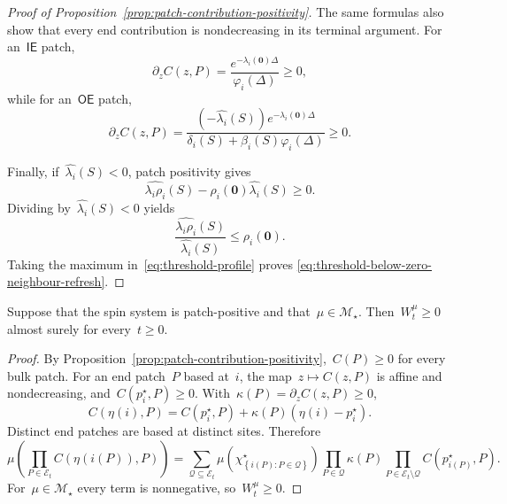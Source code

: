 \documentclass[EJP,preprint,NODS,nobera]{ejpecp}
\newcommand{\bb}[1]{\left(#1\right)}
\newcommand{\cb}[1]{\left\{#1\right\}}
\newcommand{\mb}[1]{\mathbf{#1}}
\begin{document}
\begin{proof}[Proof of Proposition~\ref{prop:patch-contribution-positivity}]
The same formulas also show that every end contribution is nondecreasing in its
terminal argument. For an~$\mathsf{IE}$ patch,
\begin{equation*}
\partial_zC(z,P)
=
\frac{e^{-\lambda_i(\mb 0)\Delta}}{\varphi_i(\Delta)}
\geq0,
\end{equation*}
while for an~$\mathsf{OE}$ patch,
\begin{equation*}
\partial_zC(z,P)
=
\frac{
\bb{-\widehat{\lambda_i}(S)}
e^{-\lambda_i(\mb 0)\Delta}
}{
\delta_i(S)+\beta_i(S)\varphi_i(\Delta)
}
\geq0.
\end{equation*}

Finally, if~$\widehat{\lambda_i}(S)<0$, patch positivity gives
\begin{equation*}
\widehat{\lambda_i\rho_i}(S)
-
\rho_i(\mb 0)\widehat{\lambda_i}(S)
\geq0.
\end{equation*}
Dividing by~$\widehat{\lambda_i}(S)<0$ yields
\begin{equation*}
\frac{\widehat{\lambda_i\rho_i}(S)}
{\widehat{\lambda_i}(S)}
\leq
\rho_i(\mb 0).
\end{equation*}
Taking the maximum in~\eqref{eq:threshold-profile} proves
\eqref{eq:threshold-below-zero-neighbour-refresh}.
\end{proof}

{\color{red}
\begin{lemma}
\label{lem:nonnegative-patch-weights}
Suppose that the spin system is patch-positive and that~$\mu\in\mathcal M_\star$.
Then~$W_t^\mu\geq0$ almost surely for every~$t\geq0$.
\end{lemma}
}

\begin{proof}
By Proposition~\ref{prop:patch-contribution-positivity},~$C(P)\geq0$ for every
bulk patch. For an end patch~$P$ based at~$i$, the map~$z\mapsto C(z,P)$ is
affine and nondecreasing, and~$C(p_i^\star,P)\geq0$. With~$\kappa(P)=\partial_zC(z,P)\geq0$,
\begin{equation*}
C\bb{\eta(i),P}
=
C\bb{p_i^\star,P}
+
\kappa(P)\bb{\eta(i)-p_i^\star}.
\end{equation*}
Distinct end patches are based at distinct sites. Therefore
\begin{equation}
\label{eq:centered-end-expansion}
\mu\bb{
\prod_{P\in\mathcal E_t}
C\bb{\eta\bb{i(P)},P}
} =
\sum_{\mathcal Q\subseteq\mathcal E_t}
\mu\bb{
\chi_{\cb{i(P):P\in\mathcal Q}}^\star
}
\prod_{P\in\mathcal Q}\kappa(P)
\prod_{P\in\mathcal E_t\setminus\mathcal Q}
C\bb{p_{i(P)}^\star,P}.
\end{equation}
For~$\mu\in\mathcal M_\star$ every term is nonnegative, so~$W_t^\mu\geq0$.
\end{proof}
\end{document}
